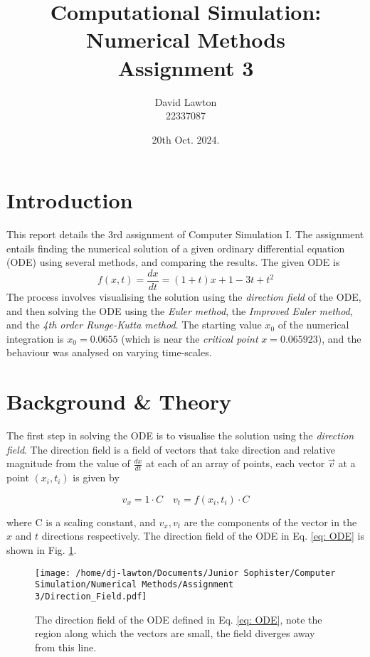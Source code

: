 \documentclass{article}
\title{Computational Simulation: Numerical Methods\\Assignment 3}
\author{David Lawton\\22337087}
\date{20th Oct. 2024.}
\theoremstyle{definition}
\theoremstyle{remark}
\begin{document}
\maketitle

\tableofcontents

\section{Introduction}
This report details the 3rd assignment of Computer Simulation I. The assignment entails finding the numerical solution of a given ordinary differential equation (ODE) using several methods, and comparing the results. The given ODE is
\begin{equation}
    \label{eq: ODE}
    f(x, t) = \frac{dx}{dt} = (1+t)x + 1 - 3t + t^2 
\end{equation} 
The process involves visualising the solution using the \textit{direction field} of the ODE, and then solving the ODE using the \textit{Euler method}, the \textit{Improved Euler method}, and the \textit{4th order Runge-Kutta method}. The starting value $x_0$ of the numerical integration is $x_0 = 0.0655$ (which is near the \textit{critical point} $x=0.065923$), and the behaviour was analysed on varying time-scales. \\

\section{Background \& Theory}

The first step in solving the ODE is to visualise the solution using the \textit{direction field}. The direction field is a field of vectors that take direction and relative magnitude from the value of $\frac{dx}{dt}$ at each of an array of points, each vector $\vec{v}$ at a point $(x_i, t_i)$ is given by

\begin{equation}
    v_x = 1\cdot C \quad v_t = f(x_i, t_i)\cdot C
\end{equation}

where C is a scaling constant, and $v_x, v_t$ are the components of the vector in the $x$ and $t$ directions respectively. The direction field of the ODE in Eq. \ref{eq: ODE} is shown in Fig. \ref{fig: direction field}. \\

\begin{figure}[H]
    \centering
    \texttt{[image: /home/dj-lawton/Documents/Junior Sophister/Computer Simulation/Numerical Methods/Assignment 3/Direction\_Field.pdf]}
    \caption{\label{fig: direction field}The direction field of the ODE defined in Eq. \ref{eq: ODE}, note the region along which the vectors are small, the field diverges away from this line.}
\end{figure}
\end{document}
